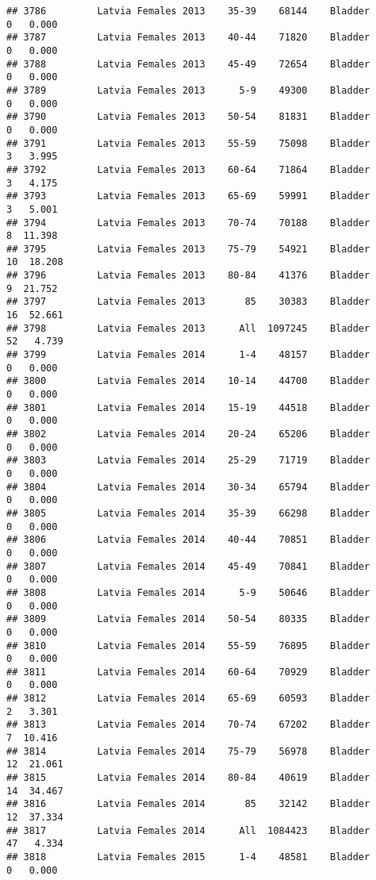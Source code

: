 \documentclass[
]{article}
\begin{document}
\begin{verbatim}
## 3786         Latvia Females 2013    35-39    68144    Bladder      0   0.000
## 3787         Latvia Females 2013    40-44    71820    Bladder      0   0.000
## 3788         Latvia Females 2013    45-49    72654    Bladder      0   0.000
## 3789         Latvia Females 2013      5-9    49300    Bladder      0   0.000
## 3790         Latvia Females 2013    50-54    81831    Bladder      0   0.000
## 3791         Latvia Females 2013    55-59    75098    Bladder      3   3.995
## 3792         Latvia Females 2013    60-64    71864    Bladder      3   4.175
## 3793         Latvia Females 2013    65-69    59991    Bladder      3   5.001
## 3794         Latvia Females 2013    70-74    70188    Bladder      8  11.398
## 3795         Latvia Females 2013    75-79    54921    Bladder     10  18.208
## 3796         Latvia Females 2013    80-84    41376    Bladder      9  21.752
## 3797         Latvia Females 2013       85    30383    Bladder     16  52.661
## 3798         Latvia Females 2013      All  1097245    Bladder     52   4.739
## 3799         Latvia Females 2014      1-4    48157    Bladder      0   0.000
## 3800         Latvia Females 2014    10-14    44700    Bladder      0   0.000
## 3801         Latvia Females 2014    15-19    44518    Bladder      0   0.000
## 3802         Latvia Females 2014    20-24    65206    Bladder      0   0.000
## 3803         Latvia Females 2014    25-29    71719    Bladder      0   0.000
## 3804         Latvia Females 2014    30-34    65794    Bladder      0   0.000
## 3805         Latvia Females 2014    35-39    66298    Bladder      0   0.000
## 3806         Latvia Females 2014    40-44    70851    Bladder      0   0.000
## 3807         Latvia Females 2014    45-49    70841    Bladder      0   0.000
## 3808         Latvia Females 2014      5-9    50646    Bladder      0   0.000
## 3809         Latvia Females 2014    50-54    80335    Bladder      0   0.000
## 3810         Latvia Females 2014    55-59    76895    Bladder      0   0.000
## 3811         Latvia Females 2014    60-64    70929    Bladder      0   0.000
## 3812         Latvia Females 2014    65-69    60593    Bladder      2   3.301
## 3813         Latvia Females 2014    70-74    67202    Bladder      7  10.416
## 3814         Latvia Females 2014    75-79    56978    Bladder     12  21.061
## 3815         Latvia Females 2014    80-84    40619    Bladder     14  34.467
## 3816         Latvia Females 2014       85    32142    Bladder     12  37.334
## 3817         Latvia Females 2014      All  1084423    Bladder     47   4.334
## 3818         Latvia Females 2015      1-4    48581    Bladder      0   0.000

\end{verbatim}
\end{document}

